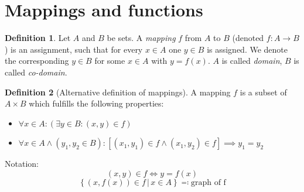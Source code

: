 \documentclass[a4paper,landscape,twocolumn]{article}
\theoremstyle{definition}
\newtheorem{defi}{Definition}
\newcommand\setdef[2]{\left\{#1\,|\,#2\right\}}
\begin{document}
\section{Mappings and functions}
\begin{defi}
  Let $A$ and $B$ be sets.
  A \emph{mapping} $f$ from $A$ to $B$ (denoted $f: A \to B$) is an assignment,
  such that for every $x \in A$ one $y \in B$ is assigned. We denote the corresponding
  $y \in B$ for some $x \in A$ with $y = f(x)$.
  $A$ is called \emph{domain}, $B$ is called \emph{co-domain}.
\end{defi}

\begin{defi}[Alternative definition of mappings]
  A mapping $f$ is a subset of $A \times B$ which fulfills the following properties:
  \begin{itemize}
    \item $\forall x \in A: \left(\exists y \in B: (x, y) \in f\right)$
    \item $\forall x \in A \land (y_1, y_2 \in B): \left[(x_1,y_1) \in f \land (x_1, y_2) \in f\right] \implies y_1 = y_2$
  \end{itemize}
  Notation:
  \[ (x, y) \in f \iff y = f(x) \]
  \[ \setdef{(x, f(x)) \in f}{x \in A} \eqqcolon \text{graph of f} \]
\end{defi}
\end{document}
